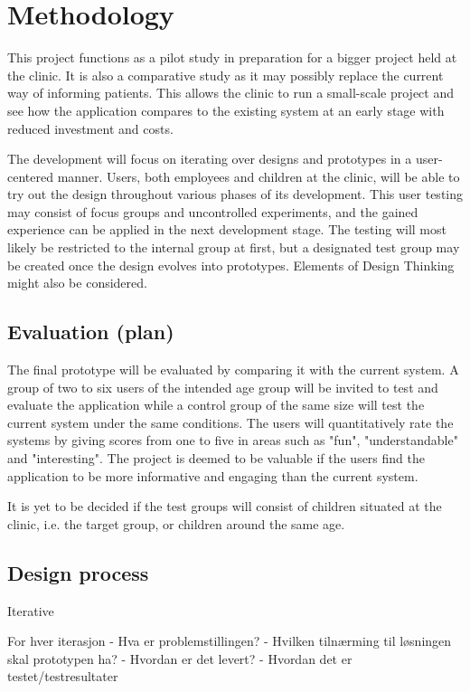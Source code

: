 \chapter{Methodology}
\label{ch:methodology}

This project functions as a pilot study in preparation for a bigger project held at the clinic. It is also a comparative study as it may possibly replace the current way of informing patients. This allows the clinic to run a small-scale project and see how the application compares to the existing system at an early stage with reduced investment and costs.

The development will focus on iterating over designs and prototypes in a user-centered manner. Users, both employees and children at the clinic, will be able to try out the design throughout various phases of its development. This user testing may consist of focus groups and uncontrolled experiments, and the gained experience can be applied in the next development stage. The testing will most likely be restricted to the internal group at first, but a designated test group may be created once the design evolves into prototypes. Elements of Design Thinking might also be considered.

\section{Evaluation (plan)}

The final prototype will be evaluated by comparing it with the current system. A group of two to six users of the intended age group will be invited to test and evaluate the application while a control group of the same size will test the current system under the same conditions. The users will quantitatively rate the systems by giving scores from one to five in areas such as "fun", "understandable" and "interesting". The project is deemed to be valuable if the users find the application to be more informative and engaging than the current system.

It is yet to be decided if the test groups will consist of children situated at the clinic, i.e. the target group, or children around the same age.

\section{Design process}

Iterative

For hver iterasjon
- Hva er problemstillingen?
- Hvilken tilnærming til løsningen skal prototypen ha?
- Hvordan er det levert?
- Hvordan det er testet/testresultater


